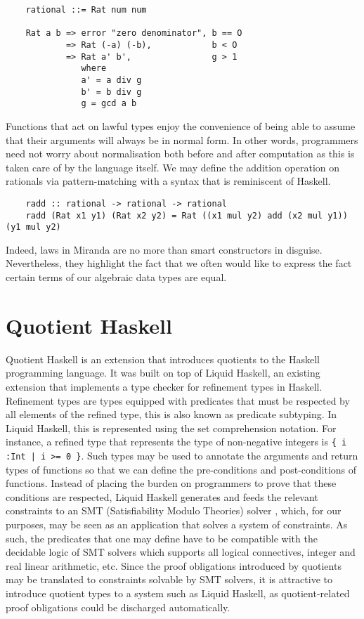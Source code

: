 \documentclass[12pt,twoside,maitrise]{dms}
\theoremstyle{definition}
\numberwithin{equation}{section}
\numberwithin{table}{chapter}
\numberwithin{figure}{chapter}
\newcommand\fn[1] {\texttt{#1}}
\begin{document}
\begin{verbatim}
    rational ::= Rat num num

    Rat a b => error "zero denominator", b == O
            => Rat (-a) (-b),            b < O
            => Rat a' b',                g > 1
               where
               a' = a div g
               b' = b div g
               g = gcd a b
\end{verbatim}

Functions that act on lawful types enjoy the convenience of being able to assume
that their arguments will always be in normal form. In other words, programmers
need not worry about normalisation both before and after computation as this is
taken care of by the language itself. We may define the addition operation on
rationals via pattern-matching with a syntax that is reminiscent of Haskell.

\begin{verbatim}
    radd :: rational -> rational -> rational
    radd (Rat x1 y1) (Rat x2 y2) = Rat ((x1 mul y2) add (x2 mul y1)) (y1 mul y2)
\end{verbatim}

Indeed, laws in Miranda are no more than smart constructors in disguise.
Nevertheless, they highlight the fact that we often would like to express the
fact certain terms of our algebraic data types are equal.

\section{Quotient Haskell}\label{sec:related-qit}

Quotient Haskell\cite{hewer2023quotient} is an extension that introduces
quotients to the Haskell programming language. It was built on top of Liquid
Haskell\cite{vazou2016liquid}, an existing extension that implements a type
checker for refinement types in Haskell. Refinement types are types equipped
with predicates that must be respected by all elements of the refined type,
this is also known as predicate subtyping. In Liquid Haskell, this is
represented using the set comprehension notation. For instance, a refined type
that represents the type of non-negative integers is \fn{\{ i :\@ Int | i >= 0
\}}. Such types may be used to annotate the arguments and return types of
functions so that we can define the pre-conditions and post-conditions of
functions. Instead of placing the burden on programmers to prove that these
conditions are respected, Liquid Haskell generates and feeds the relevant
constraints to an SMT (Satisfiability Modulo Theories) solver
\cite[Chap~12]{biere2009handbook}, which, for our purposes, may be seen as an
application that solves a system of constraints. As such, the predicates that
one may define have to be compatible with the decidable logic of SMT solvers
which supports all logical connectives, integer and real linear arithmetic,
etc. Since the proof obligations introduced by quotients may be translated to
constraints solvable by SMT solvers, it is attractive to introduce quotient
types to a system such as Liquid Haskell, as quotient-related proof obligations
could be discharged automatically.
\end{document}
